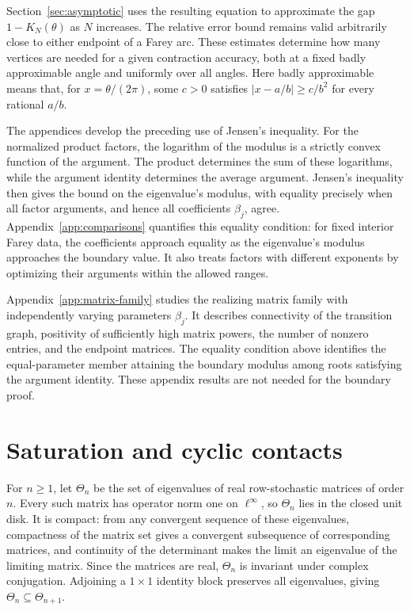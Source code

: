 \documentclass[11pt,a4paper]{article}
\theoremstyle{definition}
\theoremstyle{remark}
\numberwithin{equation}{section}
\begin{document}
Section~\ref{sec:asymptotic} uses the resulting equation to approximate the gap $1-K_N(\theta)$ as $N$ increases. The relative error bound remains valid arbitrarily close to either endpoint of a Farey arc. These estimates determine how many vertices are needed for a given contraction accuracy, both at a fixed badly approximable angle and uniformly over all angles. Here badly approximable means that, for $x=\theta/(2\pi)$, some $c>0$ satisfies $|x-a/b|\ge c/b^2$ for every rational $a/b$.

The appendices develop the preceding use of Jensen's inequality. For the normalized product factors, the logarithm of the modulus is a strictly convex function of the argument. The product determines the sum of these logarithms, while the argument identity determines the average argument. Jensen's inequality then gives the bound on the eigenvalue's modulus, with equality precisely when all factor arguments, and hence all coefficients $\beta_j$, agree. Appendix~\ref{app:comparisons} quantifies this equality condition: for fixed interior Farey data, the coefficients approach equality as the eigenvalue's modulus approaches the boundary value. It also treats factors with different exponents by optimizing their arguments within the allowed ranges.

Appendix~\ref{app:matrix-family} studies the realizing matrix family with independently varying parameters $\beta_j$. It describes connectivity of the transition graph, positivity of sufficiently high matrix powers, the number of nonzero entries, and the endpoint matrices. The equality condition above identifies the equal-parameter member attaining the boundary modulus among roots satisfying the argument identity. These appendix results are not needed for the boundary proof.


\section{Saturation and cyclic contacts}
For $n\ge1$, let $\Theta_n$ be the set of eigenvalues of real row-stochastic matrices of order $n$. Every such matrix has operator norm one on $\ell^\infty$, so $\Theta_n$ lies in the closed unit disk. It is compact: from any convergent sequence of these eigenvalues, compactness of the matrix set gives a convergent subsequence of corresponding matrices, and continuity of the determinant makes the limit an eigenvalue of the limiting matrix. Since the matrices are real, $\Theta_n$ is invariant under complex conjugation. Adjoining a $1\times1$ identity block preserves all eigenvalues, giving $\Theta_n\subseteq\Theta_{n+1}$.
\end{document}
